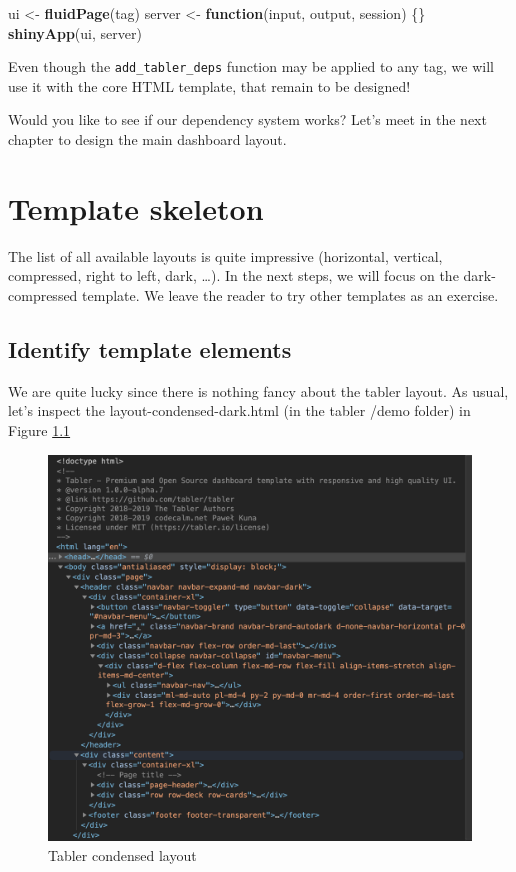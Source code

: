 \documentclass[
]{book}
\newenvironment{Shaded}{\begin{snugshade}}{\end{snugshade}}
\newcommand{\ControlFlowTok}[1]{\textcolor[rgb]{0.13,0.29,0.53}{\textbf{#1}}}
\newcommand{\KeywordTok}[1]{\textcolor[rgb]{0.13,0.29,0.53}{\textbf{#1}}}
\newcommand{\NormalTok}[1]{#1}
\newcommand{\StringTok}[1]{\textcolor[rgb]{0.31,0.60,0.02}{#1}}
\begin{document}
\begin{Shaded}
\begin{Highlighting}[]
\NormalTok{ui <-}\StringTok{ }\KeywordTok{fluidPage}\NormalTok{(tag)}
\NormalTok{server <-}\StringTok{ }\ControlFlowTok{function}\NormalTok{(input, output, session) \{\}}
\KeywordTok{shinyApp}\NormalTok{(ui, server)}
\end{Highlighting}
\end{Shaded}

Even though the \texttt{add\_tabler\_deps} function may be applied to any tag, we will use it with the core HTML template, that remain to be designed!

Would you like to see if our dependency system works? Let's meet in the next chapter to design the main dashboard layout.

\hypertarget{custom-templates-skeleton}{%
\chapter{Template skeleton}\label{custom-templates-skeleton}}

The list of all available layouts is quite impressive (horizontal, vertical, compressed, right to left, dark, \ldots). In the next steps, we will focus on the dark-compressed template. We leave the reader to try other templates as an exercise.

\hypertarget{identify-template-elements}{%
\section{Identify template elements}\label{identify-template-elements}}

We are quite lucky since there is nothing fancy about the tabler layout. As usual, let's inspect the layout-condensed-dark.html (in the tabler /demo folder) in Figure \ref{fig:tabler-layout-intro}

\begin{figure}
\includegraphics[width=17.56in]{images/practice/tabler-layout-intro} \caption{Tabler condensed layout}\label{fig:tabler-layout-intro}
\end{figure}
\end{document}
